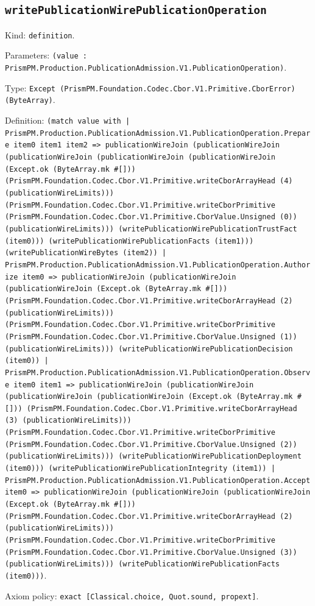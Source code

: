 \documentclass[11pt]{article}
\begin{document}
\subsection*{\texttt{writePublicationWirePublicationOperation}}
\noindent Kind: \texttt{definition}.\par
\noindent Parameters: \texttt{(value : PrismPM.Production.PublicationAdmission.V1.PublicationOperation)}.\par
\noindent Type: \texttt{Except (PrismPM.Foundation.Codec.Cbor.V1.Primitive.CborError) (ByteArray)}.\par
\noindent Definition: \texttt{(match value with | PrismPM.Production.PublicationAdmission.V1.PublicationOperation.Prepare item0 item1 item2 => publicationWireJoin (publicationWireJoin (publicationWireJoin (publicationWireJoin (publicationWireJoin (Except.ok (ByteArray.mk \#[])) (PrismPM.Foundation.Codec.Cbor.V1.Primitive.writeCborArrayHead (4) (publicationWireLimits))) (PrismPM.Foundation.Codec.Cbor.V1.Primitive.writeCborPrimitive (PrismPM.Foundation.Codec.Cbor.V1.Primitive.CborValue.Unsigned (0)) (publicationWireLimits))) (writePublicationWirePublicationTrustFact (item0))) (writePublicationWirePublicationFacts (item1))) (writePublicationWireBytes (item2)) | PrismPM.Production.PublicationAdmission.V1.PublicationOperation.Authorize item0 => publicationWireJoin (publicationWireJoin (publicationWireJoin (Except.ok (ByteArray.mk \#[])) (PrismPM.Foundation.Codec.Cbor.V1.Primitive.writeCborArrayHead (2) (publicationWireLimits))) (PrismPM.Foundation.Codec.Cbor.V1.Primitive.writeCborPrimitive (PrismPM.Foundation.Codec.Cbor.V1.Primitive.CborValue.Unsigned (1)) (publicationWireLimits))) (writePublicationWirePublicationDecision (item0)) | PrismPM.Production.PublicationAdmission.V1.PublicationOperation.Observe item0 item1 => publicationWireJoin (publicationWireJoin (publicationWireJoin (publicationWireJoin (Except.ok (ByteArray.mk \#[])) (PrismPM.Foundation.Codec.Cbor.V1.Primitive.writeCborArrayHead (3) (publicationWireLimits))) (PrismPM.Foundation.Codec.Cbor.V1.Primitive.writeCborPrimitive (PrismPM.Foundation.Codec.Cbor.V1.Primitive.CborValue.Unsigned (2)) (publicationWireLimits))) (writePublicationWirePublicationDeployment (item0))) (writePublicationWirePublicationIntegrity (item1)) | PrismPM.Production.PublicationAdmission.V1.PublicationOperation.Accept item0 => publicationWireJoin (publicationWireJoin (publicationWireJoin (Except.ok (ByteArray.mk \#[])) (PrismPM.Foundation.Codec.Cbor.V1.Primitive.writeCborArrayHead (2) (publicationWireLimits))) (PrismPM.Foundation.Codec.Cbor.V1.Primitive.writeCborPrimitive (PrismPM.Foundation.Codec.Cbor.V1.Primitive.CborValue.Unsigned (3)) (publicationWireLimits))) (writePublicationWirePublicationFacts (item0)))}.\par
\noindent Axiom policy: \texttt{exact [Classical.choice, Quot.sound, propext]}.\par
\end{document}
